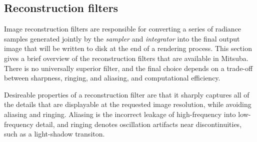 \newpage
\subsection{Reconstruction filters}
\label{sec:rfilters}
Image reconstruction filters are responsible for converting a series of radiance samples generated
jointly by the \emph{sampler} and \emph{integrator} into the final output image that will be written
to disk at the end of a rendering process.
This section gives a brief overview of the reconstruction filters that are available in Mitsuba.
There is no universally superior filter, and the final choice depends on a trade-off between
sharpness, ringing, and aliasing, and computational efficiency.

Desireable properties of a reconstruction filter are that it sharply captures all of the details that
are displayable at the requested image resolution, while avoiding aliasing and ringing. Aliasing is
the incorrect leakage of high-frequency into low-frequency detail, and ringing denotes oscillation artifacts
near discontinuities, such as a light-shadow transiton.

